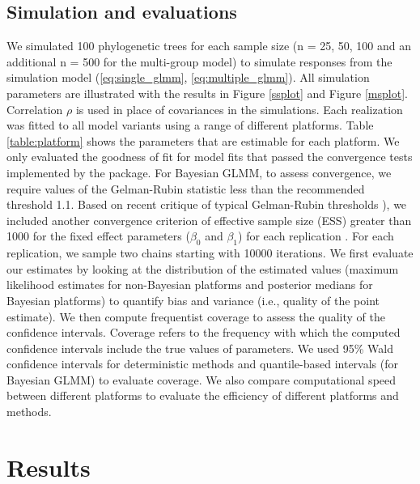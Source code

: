 \documentclass[12pt]{article}
\begin{document}
\subsection*{Simulation and evaluations}
We simulated 100 phylogenetic trees for each sample size (n = 25, 50, 100 and an additional n = 500 for the multi-group model) to simulate responses from the simulation model (\ref{eq:single_glmm}, \ref{eq:multiple_glmm}). All simulation parameters are illustrated with the results in Figure \ref{ssplot} and Figure \ref{msplot}. Correlation $\rho$ is used in place of covariances in the simulations.
Each realization was fitted to all model variants using a range of different platforms.
Table \ref{table:platform} shows the parameters that are estimable for each platform. 
We only evaluated the goodness of fit for model fits that passed the convergence tests implemented by the package.
For Bayesian GLMM, to assess convergence, we require values of the Gelman-Rubin statistic less than the recommended threshold 1.1. Based on recent critique of typical Gelman-Rubin thresholds \citep{vats2018revisiting}), we included another convergence criterion of effective sample size (ESS) greater than 1000 for the fixed effect parameters ($\beta_{0}$ and $\beta_{1}$) for each replication \citep{vehtari2019rank}. 
For each replication, we sample two chains starting with 10000 iterations. 
We first evaluate our estimates by looking at the distribution of the estimated values (maximum likelihood estimates for non-Bayesian platforms and posterior medians for Bayesian platforms) to quantify bias and variance (i.e., quality of the point estimate).
We then compute frequentist coverage to assess the quality of the confidence intervals.
Coverage refers to the frequency with which the computed confidence intervals include the true values of parameters.
We used 95\% Wald confidence intervals for deterministic methods and quantile-based intervals (for Bayesian GLMM) to evaluate coverage.
We also compare computational speed between different platforms to evaluate the efficiency of different platforms and methods. 

\section*{Results}
\end{document}
